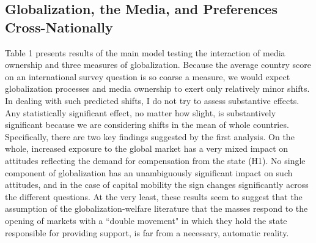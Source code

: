 \documentclass[12pt]{report}
\begin{document}
\subsection{Globalization, the Media, and Preferences Cross-Nationally}

Table 1 presents results of the main model testing the interaction of media ownership and three measures of globalization. Because the average country score on an international survey question is so coarse a measure, we would expect globalization processes and media ownership to exert only relatively minor shifts. In dealing with such predicted shifts, I do not try to assess substantive effects. Any statistically significant effect, no matter how slight, is substantively significant because we are considering shifts in the mean of whole countries. Specifically, there are two key findings suggested by the first analysis. On the whole, increased exposure to the global market has a very mixed impact on attitudes reflecting the demand for compensation from the state (H1). No single component of globalization has an unambiguously significant impact on such attitudes, and in the case of capital mobility the sign changes significantly across the different questions. At the very least, these results seem to suggest that the assumption of the globalization-welfare literature that the masses respond to the opening of markets with a ``double movement" in which they hold the state responsible for providing support, is far from a necessary, automatic reality.
\pagebreak
\end{document}
